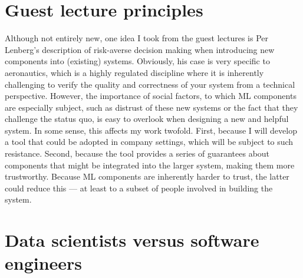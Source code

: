 \section*{Guest lecture principles}


    Although not entirely new, one idea I took from the guest lectures is Per Lenberg's description of risk-averse decision making when introducing new components into (existing) systems.
    Obviously, his case is very specific to aeronautics, which is a highly regulated discipline where it is inherently challenging to verify the quality and correctness of your system from a technical perspective.
    However, the importance of social factors, to which ML components are especially subject, such as distrust of these new systems or the fact that they challenge the status quo, is easy to overlook when designing a new and helpful system.
    In some sense, this affects my work twofold.
    First, because I will develop a tool that could be adopted in company settings, which will be subject to such resistance.
    Second, because the tool provides a series of guarantees about components that might be integrated into the larger system, making them more trustworthy.
    Because ML components are inherently harder to trust, the latter could reduce this --- at least to a subset of people involved in building the system.



\section*{Data scientists versus software engineers}


